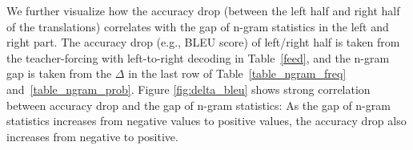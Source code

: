 \documentclass[11pt,a4paper]{article}
\begin{document}


\begin{figure*}
\centering
{}
\caption{Accuracy drop (the gap between the left/right BLEU score) with respect to the $\Delta RF_3$ and $\Delta RP_3$ from Table~\ref{table_ngram_freq} and~\ref{table_ngram_prob} in the four translation tasks. The x-axis $\Delta RF_3$ and $\Delta RP_3$ represent the gap of between the left and right ratio of the 3-gram frequency/conditional probability defined in Table \ref{table_ngram_freq} and \ref{table_ngram_prob}. The y-axis represents the accuracy drop in terms of BLEU score calculated by the teacher forcing decoding.}
\label{fig:delta_bleu}
\end{figure*}

We further visualize how the accuracy drop (between the left half and right half of the translations) correlates with the gap of n-gram statistics in the left and right part. The accuracy drop (e.g., BLEU score) of left/right half is taken from the teacher-forcing with left-to-right decoding in Table~\ref{feed}, and the n-gram gap is taken from the $\Delta$ in the last row of Table~\ref{table_ngram_freq} and~\ref{table_ngram_prob}. Figure \ref{fig:delta_bleu} shows strong correlation between accuracy drop and the gap of n-gram statistics: As the gap of n-gram statistics increases from negative values to positive values, the accuracy drop also increases from negative to positive.
\end{document}
